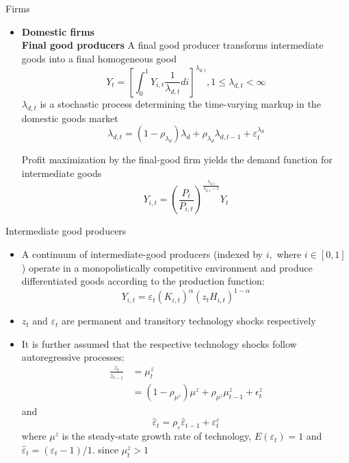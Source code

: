 \documentclass[9pt]{beamer}
\begin{document}
\begin{frame}{Firms}
\begin{itemize}
    \item \textbf{Domestic firms} \\
    
    \textbf{Final good producers} A final good producer transforms intermediate goods into a final homogeneous good
$$
    Y_{t}=\left[\int_{0}^{1} Y_{i, t} \frac{1}{\lambda_{d, t}} d i\right]^{\lambda_{d, t}}, 1 \leq \lambda_{d, t}<\infty
$$
$\lambda_{d, t}$ is a stochastic process determining the time-varying markup in the domestic goods market
$$
\lambda_{d, t}=\left(1-\rho_{\lambda_{d}}\right) \lambda_{d}+\rho_{\lambda_{d}} \lambda_{d, t-1}+\varepsilon_{t}^{\lambda_{d}}
$$
    
Profit maximization by the final-good firm yields the demand
function for intermediate goods
$$
    Y_{i, t}=\left(\frac{P_{t}}{P_{i, t}}\right)^{\frac{\lambda_{d, t}}{\lambda_{d, t}-1}} Y_{t}
$$
    
\end{itemize}

\end{frame}
\begin{frame}{Intermediate good producers}
\begin{itemize}
    \item A continuum of intermediate-good producers (indexed by $i,$ where $i \in[0,1]$ ) operate in a monopolistically competitive environment and produce differentiated goods according to the production function:
$$
Y_{i, t}=\varepsilon_{t}\left(K_{i, t}\right)^{\alpha}\left(z_{t} H_{i, t}\right)^{1-\alpha}
$$
    
        
    \item $z_t$ and $\varepsilon_t$ are permanent and transitory technology shocks respectively  
  
   \item It is further assumed that the respective technology shocks follow autoregressive processes:
$$
    \begin{aligned}
    \frac{z_{t}}{z_{t-1}} &=\mu_{t}^{z} \\
    &=\left(1-\rho_{\mu^{z}}\right) \mu^{z}+\rho_{\mu^{z}} \mu_{t-1}^{z}+\epsilon_{t}^{z}
    \end{aligned}
$$
and
$$
    \hat{\varepsilon}_{t}=\rho_{\varepsilon} \hat{\varepsilon}_{t-1}+\varepsilon_{t}^{\varepsilon}
$$
where $\mu^{z}$ is the steady-state growth rate of technology, $E\left(\varepsilon_{t}\right)=1$ and $\hat{\varepsilon}_{t}=\left(\varepsilon_{t}-1\right) / 1 .$ since $\mu_{t}^{z}>1$


\end{itemize}


\end{frame}
\end{document}
